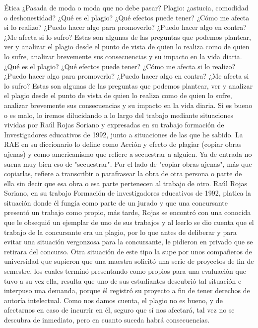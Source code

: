 Ética ¿Pasada de moda o moda que no debe pasar?
Plagio: ¿astucia, comodidad o deshonestidad?
¿Qué es el plagio? ¿Qué efectos puede tener? ¿Cómo me afecta si lo realizo? ¿Puedo hacer algo para promoverlo? ¿Puedo hacer algo en contra? ¿Me afecta si lo sufro? Estas son algunas de las preguntas que podemos plantear, ver y analizar el plagio desde el punto de vista de quien lo realiza como de quien lo sufre, analizar brevemente sus consecuencias y su impacto en la vida diaria.
¿Qué es el plagio? ¿Qué efectos puede tener? ¿Cómo me afecta si lo realizo? ¿Puedo hacer algo para promoverlo? ¿Puedo hacer algo en contra? ¿Me afecta si lo sufro? Estas son algunas de las preguntas que podemos plantear, ver y analizar el plagio desde el punto de vista de quien lo realiza como de quien lo sufre, analizar brevemente sus consecuencias y su impacto en la vida diaria.
Si es bueno o es malo, lo iremos dilucidando a lo largo del trabajo mediante situaciones vividas por Raúl Rojas Soriano y expresadas en su trabajo formación de Investigadores educativos de 1992, junto a situaciones de las que he sabido.
La RAE en su diccionario lo define como Acción y efecto de plagiar (copiar obras ajenas) y como americanismo que refiere a secuestrar a alguien. Ya de entrada no suena muy bien eso de "secuestrar". Por el lado de "copiar obras ajenas", más que copiarlas, refiere a transcribir o parafrasear la obra de otra persona o parte de ella sin decir que esa obra o esa parte pertenecen al trabajo de otro.
Raúl Rojas Soriano, en su trabajo Formación de investigadores educativos de 1992, platica la situación donde él fungía como parte de un jurado y que una concursante presentó un trabajo como propio, más tarde, Rojas se encontró con una conocida que le obsequió un ejemplar de uno de sus trabajos y al leerlo se dio cuenta que el trabajo de la concursante era un plagio, por lo que antes de deliberar y para evitar una situación vergonzosa para la concursante, le pidieron en privado que se retirara del concurso. Otra situación de este tipo la supe por unos compañeros de universidad que supieron que una maestra solicitó una serie de proyectos de fin de semestre, los cuales terminó presentando como propios para una evaluación que tuvo a su vez ella, resulta que uno de sus estudiantes descubrió tal situación e interpuso una demanda, porque él registró su proyecto a fin de tener derechos de autoría intelectual.
Como nos damos cuenta, el plagio no es bueno, y de afectarnos en caso de incurrir en él, seguro que sí nos afectará, tal vez no se descubra de inmediato, pero en cuanto suceda habrá consecuencias.
